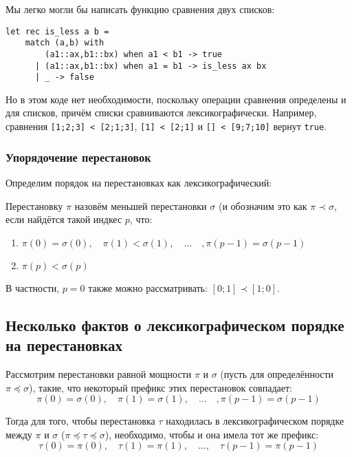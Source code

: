 \documentclass[12pt,a4paper,oneside]{article}
\begin{document}
\noindent Мы легко могли бы написать функцию сравнения двух списков:

\begin{verbatim}
let rec is_less a b =
    match (a,b) with
        (a1::ax,b1::bx) when a1 < b1 -> true
      | (a1::ax,b1::bx) when a1 = b1 -> is_less ax bx
      | _ -> false
\end{verbatim}

Но в этом коде нет необходимости, поскольку операции сравнения определены
и для списков, причём списки сравниваются лексикографически.
Например, сравнения \verb![1;2;3] < [2;1;3]!, \verb![1] < [2;1]! и \verb![] < [9;7;10]! вернут \verb!true!.

\subsubsection{Упорядочение перестановок}

Определим порядок на перестановках как лексикографический:

\begin{definition}
Перестановку $\pi$ назовём меньшей перестановки $\sigma$ (и обозначим это
как $\pi\prec\sigma$, если найдётся такой индкес $p$, что:
\begin{enumerate}
\item $\pi(0) = \sigma(0),\quad\pi(1) < \sigma(1),\quad\dots\quad,\pi(p-1)=\sigma(p-1)$
\item $\pi(p) < \sigma(p)$
\end{enumerate}
\end{definition}

\noindent В частности, $p=0$ также можно рассматривать: $[0;1]\prec[1;0]$.

\subsection{Несколько фактов о лексикографическом порядке на перестановках}

\begin{lemma}
Рассмотрим перестановки равной мощности $\pi$ и $\sigma$ (пусть для определённости $\pi\preceq\sigma$), 
такие, что некоторый префикс этих перестановок совпадает:
$$\pi(0) = \sigma(0),\quad \pi(1) =\sigma(1),\quad\dots\quad, \pi(p-1) = \sigma(p-1)$$

Тогда для того, чтобы перестановка $\tau$ находилась в лексикографическом порядке
между $\pi$ и $\sigma$ ($\pi\preceq\tau\preceq\sigma$), необходимо, чтобы и она имела
тот же префикс:
$$\tau(0) = \pi(0),\quad \tau(1) = \pi(1) ,\quad\dots,\quad \tau(p-1) = \pi(p-1)$$
\end{lemma}
\end{document}
